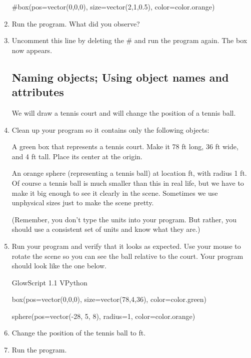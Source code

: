 \begin{enumerate}
\begin{myvpython}
#box(pos=vector(0,0,0), size=vector(2,1,0.5), color=color.orange)
\end{myvpython}

	\item Run the program. What did you observe?
	
	\item Uncomment this line by deleting the \# and run the program again. The box now appears.
	
	\subsection*{Naming objects; Using object names and attributes}
	
We will draw a tennis court and will change the position of a tennis ball.

	\item Clean up your program so it contains only the following objects:  

A green box that represents a tennis court. Make it 78 ft long, 36 ft wide, and 4 ft tall. Place its center at the origin.

An orange sphere (representing a tennis ball) at location  ft, with radius 1 ft. Of course a tennis ball is much smaller than this in real life, but we have to make it big enough to see it clearly in the scene. Sometimes we use unphysical sizes just to make the scene pretty.

(Remember, you don't type the units into your program. But rather, you should use a consistent set of units and know what they are.)

	\item Run your program and verify that it looks as expected. Use your mouse to rotate the scene so you can see the ball relative to the court. Your program should look like the one below.
	
\begin{vpythonprogram}
GlowScript 1.1 VPython

box(pos=vector(0,0,0), size=vector(78,4,36), color=color.green)

sphere(pos=vector(-28, 5, 8), radius=1, color=color.orange)

\end{vpythonprogram}
	
	
	\item Change the position of the tennis ball to  ft. 

	\item Run the program.


\end{enumerate}
